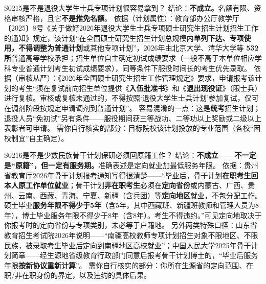 \begin{qa}{S0215}{是不是退役大学生士兵专项计划很容易拿到？}
结论：\textbf{不成立。}名额有限、资格审核严格，且它\textbf{不是推免名额}。
依据（计划属性）：教育部办公厅教学厅〔2025〕8号《关于做好2026年退役大学生士兵专项硕士研究生招生计划招生工作的通知》规定，该计划“在全国硕士研究生招生计划总规模内\textbf{单列下达、专项使用，不得调整为普通计划}或其他专项计划”，2026年由北京大学、清华大学等 \textbf{532所}普通高等学校承担；招生单位自主确定初试成绩要求（一般不高于本单位相应学科专业普通计划考生初试成绩要求），同等条件下服役时间长的考生优先录取。
依据（审核从严）：《2026年全国硕士研究生招生工作管理规定》要求，申请报考该计划的考生“须在复试前向招生单位提供《\textbf{入伍批准书}》和《\textbf{退出现役证}》（限士兵）进行复核。审核或复核未通过的，不得按照‘退役大学生士兵计划’参加复试，仅可在调剂阶段按规定申请调剂到普通计划”。
容易混淆的一点：这是\textbf{统考}招生计划；退役人员“免初试”另有条件——服役期间获三等战功、二等功以上奖励或二级以上表彰者可申请。
需你自行核实的部分：目标院校该计划投放的专业范围（各校“因校制宜”自主确定）。
\end{qa}

\begin{qa}{S0216}{是不是少数民族骨干计划保研必须回原籍工作？}
结论：\textbf{不成立——不一定是“原籍”，但一定有服务期。}准确表述是定向就业加最低服务年限。
依据：贵州省教育厅2026年骨干计划报考通知写得很清楚——“毕业后，骨干计划\textbf{在职考生回本人原工作单位就业}；骨干计划\textbf{非在职考生}必须在\textbf{定向省份}或内蒙古、广西、贵州、云南、西藏、青海、宁夏、新疆（含兵团）等\textbf{定向地区}就业，不包分配工作。硕士毕业\textbf{服务年限不得少于5年}（含5年，其中西藏班、新疆班教师和管理人员为8年），博士毕业服务年限不得少于8年（含8年）。考生不得违约。”可见定向地取决于你报考时的定向省份与专项类别，未必等于户籍地。
另外两类特殊口径：山东省教育招生考试院2026年说明——“南疆高校教师专项计划招生对象不限地区、不限民族，被录取考生毕业后定向到南疆地区高校就业”；中国人民大学2025年骨干计划简章——经生源地省级教育行政部门同意后报考骨干计划博士的，“毕业后服务年限\textbf{按新协议重新计算}”。
需你自行核实的部分：你所在生源省的定向范围、在职/非在职身份的界定，以及违约的具体后果。
\end{qa}


